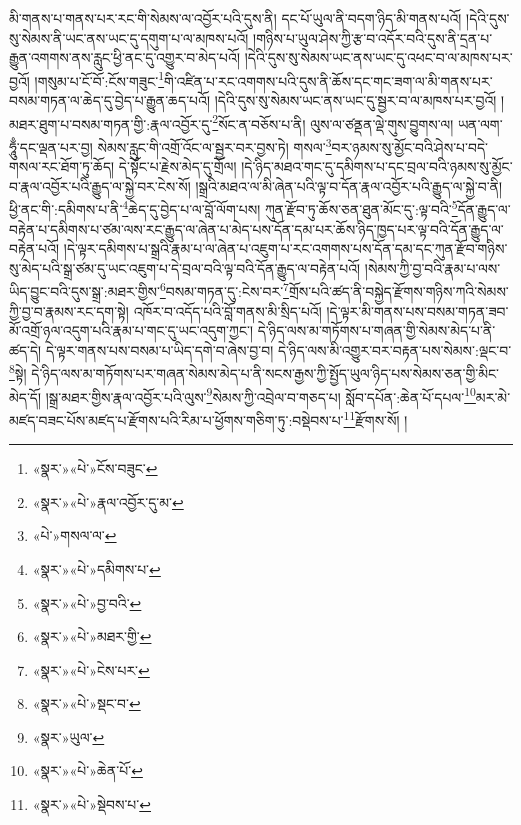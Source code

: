 མི་གནས་པ་གནས་པར་རང་གི་སེམས་ལ་འབྱོར་པའི་དུས་ནི། དང་པོ་ཡུལ་ནི་བདག་ཉིད་མི་གནས་པའོ། །དེའི་དུས་སུ་སེམས་ནི་ཡང་ནས་ཡང་དུ་དགུག་པ་ལ་མཁས་པའོ། །གཉིས་པ་ཡུལ་ཤེས་ཀྱི་རྩ་བ་འདོར་བའི་དུས་ནི་དྲན་པ་རྒྱུན་འགགས་ནས་རླུང་ཕྱི་ནང་དུ་འགྱུར་བ་མེད་པའོ། །དེའི་དུས་སུ་སེམས་ཡང་ནས་ཡང་དུ་འཕང་བ་ལ་མཁས་པར་བྱའོ། །གསུམ་པ་ངོ་བོ་:ངོས་གཟུང་\footnote{«སྣར་»«པེ་»ངོས་བཟུང་}གི་འཛིན་པ་རང་འགགས་པའི་དུས་ནི་ཆོས་དང་གང་ཟག་ལ་མི་གནས་པར་བསམ་གཏན་ལ་ཆེད་དུ་བྱེད་པ་རྒྱུན་ཆད་པའོ། །དེའི་དུས་སུ་སེམས་ཡང་ནས་ཡང་དུ་སྦྱར་བ་ལ་མཁས་པར་བྱའོ། །མཐར་ཐུག་པ་བསམ་གཏན་གྱི་:རྣལ་འབྱོར་དུ་\footnote{«སྣར་»«པེ་»རྣལ་འབྱོར་དུ་མ་}སོང་ན་བཅོས་པ་ནི། ལུས་ལ་ཙནྡན་ལྡེ་གུས་བྱུགས་ལ། ཡན་ལག་ཧཱུྃ་དང་ལྡན་པར་བྱ། སེམས་རླུང་གི་འགྲོ་འོང་ལ་སྦྱར་བར་བྱས་ཏེ། གསལ་\footnote{«པེ་»གསལ་ལ་}བར་ཉམས་སུ་མྱོང་བའི་ཤེས་པ་བདེ་གསལ་རང་ཐོག་ཏུ་ཆོད། དེ་སྟོང་པ་རྗེས་མེད་དུ་གྲོལ། །དེ་ཉིད་མཐའ་གང་དུ་དམིགས་པ་དང་བྲལ་བའི་ཉམས་སུ་མྱོང་བ་རྣལ་འབྱོར་པའི་རྒྱུད་ལ་སྐྱེ་བར་ངེས་སོ། །སྒྲའི་མཐའ་ལ་མི་ཞེན་པའི་ལྟ་བ་དོན་རྣལ་འབྱོར་པའི་རྒྱུད་ལ་སྐྱེ་བ་ནི། ཕྱི་ནང་གི་:དམིགས་པ་ནི་\footnote{«སྣར་»«པེ་»དམིགས་པ་}ཆེད་དུ་བྱེད་པ་ལ་བློ་ལོག་པས། ཀུན་རྫོབ་ཏུ་ཆོས་ཅན་ཐུན་མོང་དུ་:ལྟ་བའི་\footnote{«སྣར་»«པེ་»བྱ་བའི་}དོན་རྒྱུད་ལ་བརྟེན་པ་དམིགས་པ་ཙམ་ལས་རང་རྒྱུད་ལ་ཞེན་པ་མེད་པས་དོན་དམ་པར་ཆོས་ཉིད་ཁྱད་པར་ལྟ་བའི་དོན་རྒྱུད་ལ་བརྟེན་པའོ། །དེ་ལྟར་དམིགས་པ་སྒྲའི་རྣམ་པ་ལ་ཞེན་པ་འཇུག་པ་རང་འགགས་པས་དོན་དམ་དང་ཀུན་རྫོབ་གཉིས་སུ་མེད་པའི་སྒྲ་ཙམ་དུ་ཡང་འཇུག་པ་དེ་བྲལ་བའི་ལྟ་བའི་དོན་རྒྱུད་ལ་བརྟེན་པའོ། །སེམས་ཀྱི་བྱ་བའི་རྣམ་པ་ལས་ཡིད་བྱུང་བའི་དུས་སྒྲ་:མཐར་གྱིས་\footnote{«སྣར་»«པེ་»མཐར་གྱི་}བསམ་གཏན་དུ་:ངེས་བར་\footnote{«སྣར་»«པེ་»ངེས་པར་}གྲོས་པའི་ཚད་ནི་བསྐྱེད་རྫོགས་གཉིས་ཀའི་སེམས་ཀྱི་བྱ་བ་རྣམས་རང་དག་སྟེ། འཁོར་བ་འདོད་པའི་བློ་གནས་མི་སྲིད་པའོ། །དེ་ལྟར་མི་གནས་པས་བསམ་གཏན་ཟབ་མོ་འགྲོ་ཉལ་འདུག་པའི་རྣམ་པ་གང་དུ་ཡང་འདུག་ཀྱང་། དེ་ཉིད་ལས་མ་གཏོགས་པ་གཞན་གྱི་སེམས་མེད་པ་ནི་ཚད་དེ། དེ་ལྟར་གནས་པས་བསམ་པ་ཡིད་དགེ་བ་ཞེས་བྱ་བ། དེ་ཉིད་ལས་མི་འགྱུར་བར་བརྟན་པས་སེམས་:ལྡང་བ་\footnote{«སྣར་»«པེ་»སྡང་བ་}སྟེ། དེ་ཉིད་ལས་མ་གཏོགས་པར་གཞན་སེམས་མེད་པ་ནི་སངས་རྒྱས་ཀྱི་སྤྱོད་ཡུལ་ཉིད་པས་སེམས་ཅན་གྱི་མིང་མེད་དོ། །སྒྲ་མཐར་གྱིས་རྣལ་འབྱོར་པའི་ལུས་\footnote{«སྣར་»ཡུལ་}སེམས་ཀྱི་འབྲེལ་བ་གཅད་པ། སློབ་དཔོན་:ཆེན་པོ་དཔལ་\footnote{«སྣར་»«པེ་»ཆེན་པོ་}མར་མེ་མཛད་བཟང་པོས་མཛད་པ་རྫོགས་པའི་རིམ་པ་ཕྱོགས་གཅིག་ཏུ་:བསྡེབས་པ་\footnote{«སྣར་»«པེ་»སྡེབས་པ་}རྫོགས་སོ། ། 